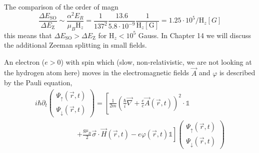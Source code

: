 The comparison of the order of magn
\begin{equation}
    \frac{\Delta E_{\mathrm{SO}}}{\Delta E_{\mathrm{Z}}} \sim \frac{\alpha^{2} E_{R}}{\mu_{B} \mathrm{H}_{z}}=\frac{1}{137^{2}} \frac{13.6}{5.8 \cdot 10^{-9}} \frac{1}{\mathrm{H}_{z}[\mathrm{G}]}=1.25 \cdot 10^{5} / \mathrm{H}_{z}[G]
    \end{equation}
this means that $\Delta E_{\mathrm{SO}}>\Delta E_{\mathrm{Z}}$ for $\mathrm{H}_{z}<10^{5}$ Gauss. In Chapter 14 we will discuss the additional Zeeman splitting in small fields.\par
An electron ($e> 0$) with spin which (slow, non-relativistic, we are not looking at the hydrogen atom here) moves in the electromagnetic fields $\vec{A}$ and $\varphi$ is described by the Pauli equation,
\begin{equation}
\begin{aligned} 
i \hbar \partial_{t}\left(\begin{array}{c}{\Psi_{\uparrow}(\vec{r}, t)} \\ {\Psi_{\downarrow}(\vec{r}, t)}\end{array}\right)=\left[\frac{1}{2 m}\left(\frac{\hbar}{i} \vec{\nabla}+\frac{e}{c} \vec{A}(\vec{r}, t)\right)^{2}\right.\cdot\mathbb{1} \\ \qquad\qquad\qquad\left.+\frac{g \mu_{B}}{2} \vec{\sigma} \cdot \vec{H}(\vec{r}, t)-e \varphi(\vec{r}, t) \mathbb{1}\right]\left(\begin{array}{l}{\Psi_{\uparrow}(\vec{r}, t)} \\ {\Psi_{\downarrow}(\vec{r}, t)}\end{array}\right) \end{aligned}
\end{equation}